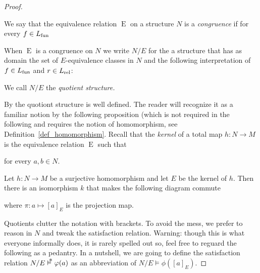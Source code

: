 \begin{proof}
\begin{definition}\label{def_congruence}
We say that the equivalence relation $\mathrel{E}$ on a structure $N$ is a \emph{congruence\/} if for every $f\in L_{\rm fun}$


When $\mathrel{E}$ is a congruence on $N$ we write \emph{$N/E$\/} for the a structure that has as domain the set of $E$-equivalence classes in $N$ and the following interpretation of $f\in L_{\rm fun}$ and $r\in L_{\rm rel}$:



We call $N/E$ the \emph{quotient structure.}
\end{definition}

By  the quotiont structure is well defined.
The reader will recognize it as a familiar notion by the following proposition (which is not required in the following and requires the notion of homomorphism, see Definition~\ref{def_homomorphism}.
Recall that the \emph{kernel\/} of a total map $h:N\to M$ is the equivalence relation $\mathrel{E}$ such that


for every $a,b\in N$.

\begin{proposition}
Let $h:N\to M$ be a surjective homomorphism and let $E$ be the kernel of $h$.
Then there is an isomorphism $k$ that makes the following diagram commute

\hspace*{25ex}

where $\pi:a\mapsto [a]_E$ is the projection map.
\end{proposition}

\noindent\llap{\textcolor{red}{\Large\warning}\kern1.5ex}%
Quotients clutter the notation with brackets.
To avoid the mess, we prefer to reason in $N$ and tweak the satisfaction relation.
Warning: though this is what everyone informally does, it is rarely spelled out so, feel free to reguard the following as a pedantry.
In a nutshell, we are going to define the satisfaction relation $N/E\pmodels\phi(a)$ as an abbreviation of $N/E\models\phi([a]_E)$.


\end{proof}
